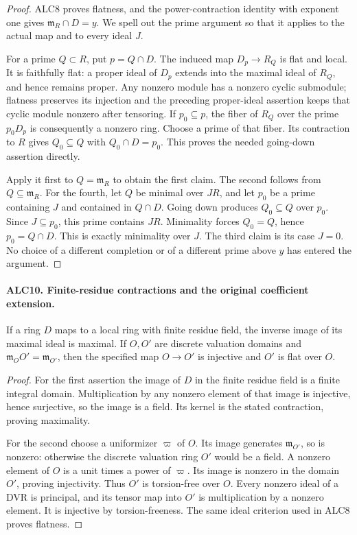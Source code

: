\documentclass[11pt,a4paper]{article}
\numberwithin{equation}{section}
\theoremstyle{remark}\newtheorem{remark}[theorem]{Remark}
\begin{document}
\begin{proof}
ALC8 proves flatness, and the power-contraction identity with
exponent one gives \(\mathfrak m_R\cap D=y\).
We spell out the prime argument so that it applies to the
actual map and to every ideal \(J\).

For a prime \(Q\subset R\), put \(p=Q\cap D\).
The induced map \(D_p\to R_Q\) is flat and local.  It is
faithfully flat: a proper ideal of \(D_p\) extends into the
maximal ideal of \(R_Q\), and hence remains proper.  Any
nonzero module has a nonzero cyclic submodule; flatness
preserves its injection and the preceding proper-ideal
assertion keeps that cyclic module nonzero after tensoring.
If \(p_0\subseteq p\), the fiber of \(R_Q\) over the
prime \(p_0D_p\) is consequently a nonzero ring.  Choose
a prime of that fiber.  Its contraction to \(R\) gives
\(Q_0\subseteq Q\) with \(Q_0\cap D=p_0\).
This proves the needed going-down assertion directly.

Apply it first to \(Q=\mathfrak m_R\) to obtain the first
claim.  The second follows from \(Q\subseteq\mathfrak m_R\).
For the fourth, let \(Q\) be minimal over \(JR\), and
let \(p_0\) be a prime containing \(J\) and contained in
\(Q\cap D\).  Going down produces \(Q_0\subseteq Q\)
over \(p_0\).  Since \(J\subseteq p_0\), this prime
contains \(JR\).  Minimality forces \(Q_0=Q\), hence
\(p_0=Q\cap D\).  This is exactly minimality over \(J\).
The third claim is its case \(J=0\).  No choice of a
different completion or of a different prime above \(y\)
has entered the argument.
\end{proof}

\paragraph{ALC10. Finite-residue contractions and the original coefficient extension.}
\label{claim:ALC10}
If a ring \(D\) maps to a local ring with finite residue
field, the inverse image of its maximal ideal is maximal.
If \(O,O'\) are discrete valuation domains and
\(\mathfrak m_OO'=\mathfrak m_{O'}\), then the specified
map \(O\to O'\) is injective and \(O'\) is flat over \(O\).

\begin{proof}
For the first assertion the image of \(D\) in the finite
residue field is a finite integral domain.  Multiplication
by any nonzero element of that image is injective, hence
surjective, so the image is a field.  Its kernel is the
stated contraction, proving maximality.

For the second choose a uniformizer \(\varpi\) of \(O\).
Its image generates \(\mathfrak m_{O'}\), so is nonzero:
otherwise the discrete valuation ring \(O'\) would be a
field.  A nonzero element of \(O\) is a unit times a power
of \(\varpi\).  Its image is nonzero in the domain \(O'\),
proving injectivity.  Thus \(O'\) is torsion-free over \(O\).
Every nonzero ideal of a DVR is principal, and its tensor
map into \(O'\) is multiplication by a nonzero element.
It is injective by torsion-freeness.  The same ideal
criterion used in ALC8 proves flatness.
\end{proof}
\end{document}
